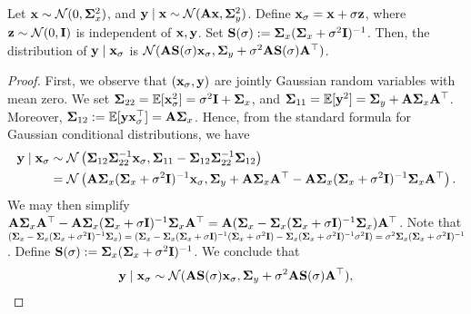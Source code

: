 \begin{lemma}\label{eq:lem_gaussian_eiv} Let ${\mathbf{x}} \sim \mathcal{N}(0,\bm{\Sigma}_x^2)$,  and $\mathbf{y} \mid {\mathbf{x}}\sim \mathcal{N}(\mathbf{A} {\mathbf{x}}, \bm{\Sigma}_y^2)$. Define ${\mathbf{x}}_{\sigma} = {\mathbf{x}} + \sigma \mathbf{z}$, where $\mathbf{z} \sim \mathcal{N}(0,\mathbf{I})$ is independent of ${\mathbf{x}},\mathbf{y}$.  Set $\mathbf{S}(\sigma) := \bm{\Sigma}_x(\bm{\Sigma}_x + \sigma^2 \mathbf{I})^{-1}$.  Then, the distribution of $\mathbf{y} \mid {\mathbf{x}}_{\sigma} $ is         $\mathcal{N}(\mathbf{A} \mathbf{S}(\sigma) {\mathbf{x}}_{\sigma}, \bm{\Sigma}_y + \sigma^2 \mathbf{A} \mathbf{S}(\sigma)\mathbf{A}^\top )$.
\end{lemma}
\begin{proof} First, we observe that $({\mathbf{x}}_{\sigma},\mathbf{y})$ are jointly Gaussian random variables with mean zero. We set $\bm{\Sigma}_{22} = \mathbb{E}[{\mathbf{x}}_{\sigma}^2] = \sigma^2 \mathbf{I} + \bm{\Sigma}_x$, and $\bm{\Sigma}_{11} = \mathbb{E}[\mathbf{y}^2] = \bm{\Sigma}_y + \mathbf{A} \bm{\Sigma}_x \mathbf{A}^\top$. Moreover, $\bm{\Sigma}_{12} := \mathbb{E}[\mathbf{y} {\mathbf{x}}_{\sigma}^\top] = \mathbf{A} \bm{\Sigma}_x$. Hence, from the standard formula for Gaussian conditional distributions, we have 
\begin{align*}
    \mathbf{y} \mid {\mathbf{x}}_{\sigma} 
    &\sim \mathcal{N}\left(\bm{\Sigma}_{12}\bm{\Sigma}_{22}^{-1}{\mathbf{x}}_{\sigma}, \bm{\Sigma}_{11} - \bm{\Sigma}_{12}\bm{\Sigma}_{22}^{-1}\bm{\Sigma}_{12}\right)\\
    &= \mathcal{N}\left( \mathbf{A} \bm{\Sigma}_x(\bm{\Sigma}_x + \sigma^2 \mathbf{I})^{-1} {\mathbf{x}}_{\sigma}, \bm{\Sigma}_y + \mathbf{A} \bm{\Sigma}_x \mathbf{A}^\top - \mathbf{A} \bm{\Sigma}_x(\bm{\Sigma}_x + \sigma^2 \mathbf{I})^{-1} \bm{\Sigma}_x \mathbf{A}^\top \right).
\end{align*}
    We may then simplify $\mathbf{A} \bm{\Sigma}_x \mathbf{A}^\top - \mathbf{A} \bm{\Sigma}_x(\bm{\Sigma}_x + \sigma \mathbf{I})^{-1} \bm{\Sigma}_x \mathbf{A}^\top = \mathbf{A} (\bm{\Sigma}_x - \bm{\Sigma}_x(\bm{\Sigma}_x + \sigma \mathbf{I})^{-1} \bm{\Sigma}_x)  \mathbf{A}^\top$. Note that $(\bm{\Sigma}_x - \bm{\Sigma}_x(\bm{\Sigma}_x + \sigma^2 \mathbf{I})^{-1} \bm{\Sigma}_x)  = (\bm{\Sigma}_x - \bm{\Sigma}_x(\bm{\Sigma}_x + \sigma \mathbf{I})^{-1} (\bm{\Sigma}_x + \sigma^2 \mathbf{I}) - \bm{\Sigma}_x(\bm{\Sigma}_x + \sigma^2 \mathbf{I})^{-1} \sigma^2 \mathbf{I} ) = \sigma^2 \bm{\Sigma}_x (\bm{\Sigma}_x + \sigma^2 \mathbf{I})^{-1}$. Define $\mathbf{S}(\sigma) := \bm{\Sigma}_x(\bm{\Sigma}_x + \sigma^2 \mathbf{I})^{-1}$. We conclude that
    \begin{align}
        \mathbf{y} \mid {\mathbf{x}}_{\sigma}   \sim \mathcal{N}(\mathbf{A} \mathbf{S}(\sigma) {\mathbf{x}}_{\sigma}, \bm{\Sigma}_y + \sigma^2 \mathbf{A} \mathbf{S}(\sigma)\mathbf{A}^\top ), 
    \end{align}
\end{proof}

